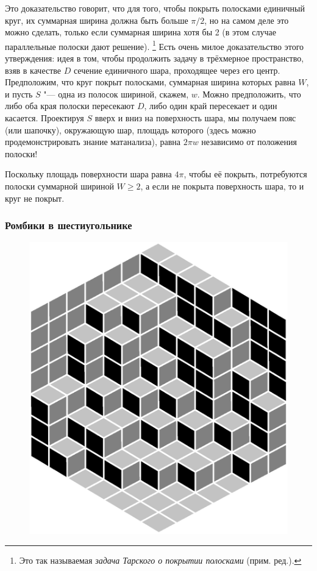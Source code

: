 \documentclass[twoside]{book}
\begin{document}
Это доказательство говорит, что для того, чтобы покрыть полосками единичный круг, их суммарная ширина должна быть больше $\pi/2$, но на самом деле это можно сделать, только если суммарная ширина хотя бы 2 (в этом случае параллельные полоски дают решение).%
\footnote{Это так называемая \emph{задача Тарского о покрытии полосками} (прим. ред.).}
Есть очень милое доказательство этого утверждения:
идея в том, чтобы продолжить задачу в трёхмерное пространство, взяв в качестве $D$ сечение единичного шара, проходящее через его центр.
Предположим, что круг покрыт полосками, суммарная ширина которых равна $W$, и пусть $S$ "--- одна из полосок шириной, скажем, $w$.
Можно предположить, что либо оба края полоски пересекают $D$, либо один край пересекает и один касается.
Проектируя $S$ вверх и вниз на поверхность шара, мы получаем пояс (или шапочку),
окружающую шар, площадь которого (здесь можно продемонстрировать знание матанализа), равна 
$2\pi w$ независимо от положения полоски!

Поскольку площадь поверхности шара равна $4\pi$, чтобы её покрыть, потребуются полоски суммарной шириной $W\ge 2$,
а если не покрыта поверхность шара, то и круг не покрыт.


\subsubsection*{Ромбики в шестиугольнике}%

\leavevmode

\begin{figure}[h]
\vskip-10mm
\centering
\includegraphics[scale=0.4]{Figs/Geometry/diamonds}
\vskip-15mm
\end{figure}
\end{document}
